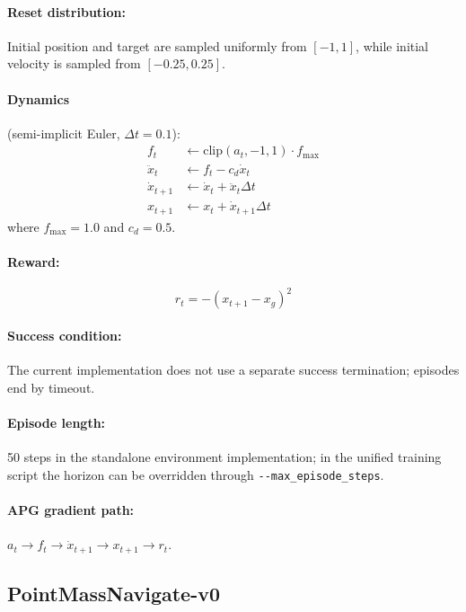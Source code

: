 \documentclass[11pt,a4paper]{article}
\begin{document}
\paragraph{Reset distribution:} Initial position and target are sampled uniformly from $[-1,1]$, while initial velocity is sampled from $[-0.25,0.25]$.

\paragraph{Dynamics} (semi-implicit Euler, $\Delta t = 0.1$):
\begin{align}
  f_t &\leftarrow \text{clip}(a_t, -1, 1) \cdot f_{\max} \\
  \ddot{x}_t &\leftarrow f_t - c_d \dot{x}_t \\
  \dot{x}_{t+1} &\leftarrow \dot{x}_t + \ddot{x}_t \Delta t \\
  x_{t+1} &\leftarrow x_t + \dot{x}_{t+1}\Delta t
\end{align}
where $f_{\max}=1.0$ and $c_d=0.5$.

\paragraph{Reward:}
\begin{equation}
  r_t = -(x_{t+1} - x_g)^2
  \label{eq:pms_reward}
\end{equation}

\paragraph{Success condition:} The current implementation does not use a separate success termination; episodes end by timeout.

\paragraph{Episode length:} 50 steps in the standalone environment implementation; in the unified training script the horizon can be overridden through \texttt{-{}-max\_episode\_steps}.

\paragraph{APG gradient path:} $a_t \rightarrow f_t \rightarrow \dot{x}_{t+1} \rightarrow x_{t+1} \rightarrow r_t$.

\subsection{PointMassNavigate-v0}
\label{sec:env_pointmass}
\end{document}
